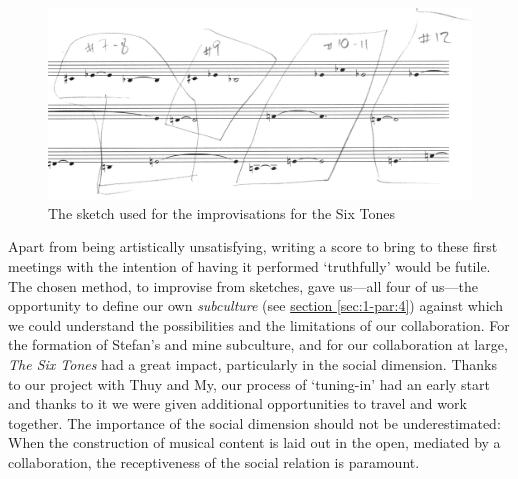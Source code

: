 \begin{figure}[!htb]
  \begin{center}
    \includegraphics[width=0.75\linewidth]{img/SixTones-transcription-1}
  \end{center}
  \caption{The sketch used for the improvisations for the Six Tones}
\label{fig:sixtones-transcription}
\end{figure}

Apart from being artistically unsatisfying, writing a score to bring to these first meetings with the intention of having it performed `truthfully' would be futile. The chosen method, to improvise from sketches, gave us---all four of us---the opportunity to define our own \emph{subculture} (see \hyperref[sec:1-par:4]{section \ref*{sec:1-par:4}}) against which we could understand the possibilities and the limitations of our collaboration. For the formation of Stefan's and mine subculture, and for our collaboration at large, \emph{The Six Tones} had a great impact, particularly in the social dimension. Thanks to our project with Thuy and My, our process of `tuning-in' had an early start and thanks to it we were given additional opportunities to travel and work together. The importance of the social dimension should not be underestimated: When the construction of musical content is laid out in the open, mediated by a collaboration, the receptiveness of the social relation is paramount.

